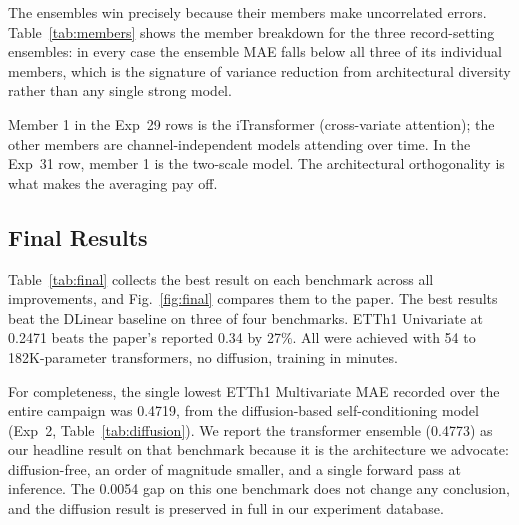 \documentclass[conference]{IEEEtran}
\begin{document}
The ensembles win precisely because their members make uncorrelated errors. Table~\ref{tab:members} shows the member breakdown for the three record-setting ensembles: in every case the ensemble MAE falls below all three of its individual members, which is the signature of variance reduction from architectural diversity rather than any single strong model.

\begin{table}[t]
\caption{Member breakdown for the record-setting ensembles. Each ensemble beats all three of its members.}
\label{tab:members}
\centering
\small
{}
\end{table}

\noindent Member 1 in the Exp~29 rows is the iTransformer (cross-variate attention); the other members are channel-independent models attending over time. In the Exp~31 row, member 1 is the two-scale model. The architectural orthogonality is what makes the averaging pay off.

\subsection{Final Results}
Table~\ref{tab:final} collects the best result on each benchmark across all improvements, and Fig.~\ref{fig:final} compares them to the paper. The best results beat the DLinear baseline on three of four benchmarks. ETTh1 Univariate at 0.2471 beats the paper's reported 0.34 by 27\%. All were achieved with 54 to 182K-parameter transformers, no diffusion, training in minutes.

For completeness, the single lowest ETTh1 Multivariate MAE recorded over the entire campaign was 0.4719, from the diffusion-based self-conditioning model (Exp~2, Table~\ref{tab:diffusion}). We report the transformer ensemble (0.4773) as our headline result on that benchmark because it is the architecture we advocate: diffusion-free, an order of magnitude smaller, and a single forward pass at inference. The 0.0054 gap on this one benchmark does not change any conclusion, and the diffusion result is preserved in full in our experiment database.
\end{document}
